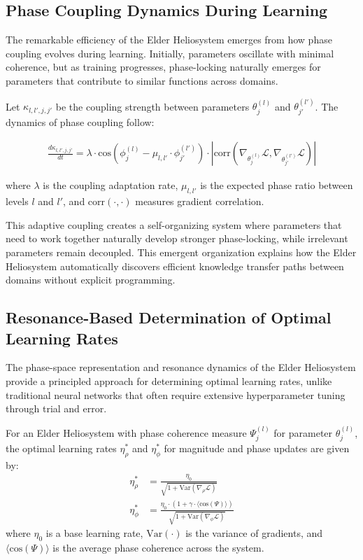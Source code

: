 \subsection{Phase Coupling Dynamics During Learning}

The remarkable efficiency of the Elder Heliosystem emerges from how phase coupling evolves during learning. Initially, parameters oscillate with minimal coherence, but as training progresses, phase-locking naturally emerges for parameters that contribute to similar functions across domains.

Let $\kappa_{l,l',j,j'}$ be the coupling strength between parameters $\theta^{(l)}_j$ and $\theta^{(l')}_{j'}$. The dynamics of phase coupling follow:

\begin{align}
\frac{d\kappa_{l,l',j,j'}}{dt} = \lambda \cdot \text{cos}(\phi^{(l)}_j - \mu_{l,l'} \cdot \phi^{(l')}_{j'}) \cdot |\text{corr}(\nabla_{\theta^{(l)}_j}\mathcal{L}, \nabla_{\theta^{(l')}_{j'}}\mathcal{L})|
\end{align}

where $\lambda$ is the coupling adaptation rate, $\mu_{l,l'}$ is the expected phase ratio between levels $l$ and $l'$, and $\text{corr}(\cdot,\cdot)$ measures gradient correlation.

This adaptive coupling creates a self-organizing system where parameters that need to work together naturally develop stronger phase-locking, while irrelevant parameters remain decoupled. This emergent organization explains how the Elder Heliosystem automatically discovers efficient knowledge transfer paths between domains without explicit programming.

\subsection{Resonance-Based Determination of Optimal Learning Rates}

The phase-space representation and resonance dynamics of the Elder Heliosystem provide a principled approach for determining optimal learning rates, unlike traditional neural networks that often require extensive hyperparameter tuning through trial and error.

\begin{theorem}
For an Elder Heliosystem with phase coherence measure $\Psi^{(l)}_j$ for parameter $\theta^{(l)}_j$, the optimal learning rates $\eta_{\rho}^*$ and $\eta_{\phi}^*$ for magnitude and phase updates are given by:
\begin{align}
\eta_{\rho}^* &= \frac{\eta_0}{\sqrt{1 + \text{Var}(\nabla_{\rho}\mathcal{L})}} \\
\eta_{\phi}^* &= \frac{\eta_0 \cdot (1 + \gamma \cdot \langle\text{cos}(\Psi)\rangle)}{\sqrt{1 + \text{Var}(\nabla_{\phi}\mathcal{L})}}
\end{align}
where $\eta_0$ is a base learning rate, $\text{Var}(\cdot)$ is the variance of gradients, and $\langle\text{cos}(\Psi)\rangle$ is the average phase coherence across the system.
\end{theorem}

